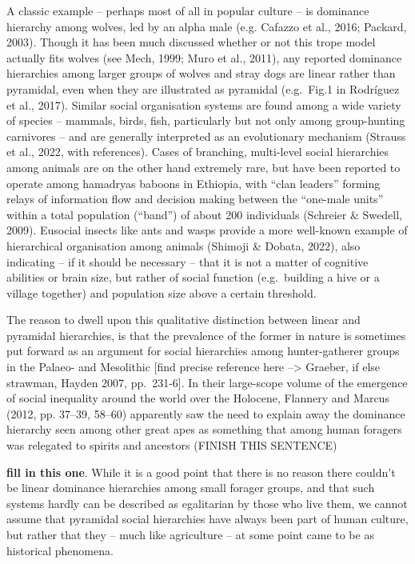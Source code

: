 \documentclass[
  12pt,
]{book}
\begin{document}
A classic example -- perhaps most of all in popular culture -- is dominance hierarchy among wolves, led by an alpha male (e.g. Cafazzo et al., 2016; Packard, 2003). Though it has been much discussed whether or not this trope model actually fits wolves (see Mech, 1999; Muro et al., 2011), any reported dominance hierarchies among larger groups of wolves and stray dogs are linear rather than pyramidal, even when they are illustrated as pyramidal (e.g.~Fig.1 in Rodríguez et al., 2017). Similar social organisation systems are found among a wide variety of species -- mammals, birds, fish, particularly but not only among group-hunting carnivores -- and are generally interpreted as an evolutionary mechanism (Strauss et al., 2022, with references). Cases of branching, multi-level social hierarchies among animals are on the other hand extremely rare, but have been reported to operate among hamadryas baboons in Ethiopia, with ``clan leaders'' forming relays of information flow and decision making between the ``one-male units'' within a total population (``band'') of about 200 individuals (Schreier \& Swedell, 2009). Eusocial insects like ants and wasps provide a more well-known example of hierarchical organisation among animals (Shimoji \& Dobata, 2022), also indicating -- if it should be necessary -- that it is not a matter of cognitive abilities or brain size, but rather of social function (e.g.~building a hive or a village together) and population size above a certain threshold.

The reason to dwell upon this qualitative distinction between linear and pyramidal hierarchies, is that the prevalence of the former in nature is sometimes put forward as an argument for social hierarchies among hunter-gatherer groups in the Palaeo- and Mesolithic {[}find precise reference here --\textgreater{} Graeber, if else strawman, Hayden 2007, pp.~231-6{]}. In their large-scope volume of the emergence of social inequality around the world over the Holocene, Flannery and Marcus (2012, pp. 37--39, 58--60) apparently saw the need to explain away the dominance hierarchy seen among other great apes as something that among human foragers was relegated to spirits and ancestors (FINISH THIS SENTENCE)

\textbf{fill in this one}. While it is a good point that there is no reason there couldn't be linear dominance hierarchies among small forager groups, and that such systems hardly can be described as egalitarian by those who live them, we cannot assume that pyramidal social hierarchies have always been part of human culture, but rather that they -- much like agriculture -- at some point came to be as historical phenomena.
\end{document}
